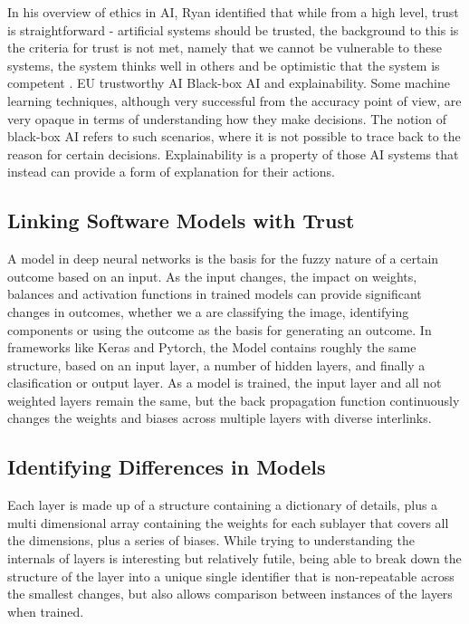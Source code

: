 In his overview of ethics in AI, Ryan \cite{ryan_ai_2020} identified that while from a high level, trust is straightforward - artificial systems should be trusted, the background to this is the criteria for trust is not met, namely that we cannot be vulnerable to these systems, the system thinks well in others and be optimistic that the system is competent \cite{mcleod_trust_2020}. 
EU trustworthy AI Black-box AI and explainability. Some machine learning techniques, although very successful from the accuracy point of view, are very opaque in terms of understanding how they make decisions. The notion of black-box AI refers to such scenarios, where it is not possible to trace back to the reason for certain decisions. Explainability is a property of those AI systems that instead can provide a form of explanation for their actions.

\subsection{Linking Software Models with Trust}
A model in deep neural networks is the basis for the fuzzy nature of a certain outcome based on an input. As the input changes, the impact on weights, balances and activation functions in trained models can provide significant changes in outcomes, whether we a are classifying the image, identifying components or using the outcome as the basis for generating an outcome. In frameworks like Keras and Pytorch, the Model contains roughly the same structure, based on an input layer, a number of hidden layers, and finally a clasification or output layer. As a model is trained, the input layer and all not weighted layers remain the same, but the back propagation function continuously changes the weights and biases across multiple layers with diverse interlinks.

\subsection{Identifying Differences in Models}
Each layer is made up of a structure containing a dictionary of details, plus a multi dimensional array containing the weights for each sublayer that covers all the dimensions, plus a series of biases. While trying to understanding the internals of layers is interesting but relatively futile, being able to break down the structure of the layer into a unique single identifier that is non-repeatable across the smallest changes, but also allows comparison between instances of the layers when trained.

